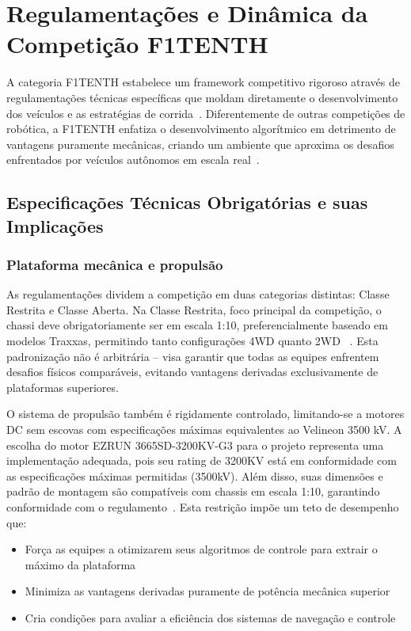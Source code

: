 \chapter{Regulamentações e Dinâmica da Competição F1TENTH}

A categoria F1TENTH estabelece um framework competitivo rigoroso através de
regulamentações técnicas específicas que moldam diretamente o desenvolvimento
dos veículos e as estratégias de corrida~\cite{F1TENTHRules2023}.
Diferentemente de outras competições de robótica, a F1TENTH enfatiza o
desenvolvimento algorítmico em detrimento de vantagens puramente mecânicas,
criando um ambiente que aproxima os desafios enfrentados por veículos autônomos
em escala real~\cite{OBrienF1TENTH2020}.

\section{Especificações Técnicas Obrigatórias e suas Implicações}

\subsection{Plataforma mecânica e propulsão}

As regulamentações dividem a competição em duas categorias distintas: Classe
Restrita e Classe Aberta. Na Classe Restrita, foco principal da competição, o
chassi deve obrigatoriamente ser em escala 1:10, preferencialmente baseado em
modelos Traxxas, permitindo tanto configurações 4WD quanto 2WD
~\cite{F1TENTHRules2023}. Esta padronização não é arbitrária -- visa garantir
que todas as equipes enfrentem desafios físicos comparáveis, evitando vantagens
derivadas exclusivamente de plataformas superiores.

O sistema de propulsão também é rigidamente controlado, limitando-se a motores
DC sem escovas com especificações máximas equivalentes ao Velineon 3500 kV. A
escolha do motor EZRUN 3665SD-3200KV-G3 para o projeto representa uma
implementação adequada, pois seu rating de 3200KV está em conformidade com as
especificações máximas permitidas (3500kV). Além disso, suas dimensões e padrão
de montagem são compatíveis com chassis em escala 1:10, garantindo conformidade
com o regulamento~\cite{F1TENTHRules2023}. Esta restrição impõe um teto de
desempenho que:

\begin{itemize}
      \item Força as equipes a otimizarem seus algoritmos de controle para extrair o máximo
            da plataforma
      \item Minimiza as vantagens derivadas puramente de potência mecânica superior
      \item Cria condições para avaliar a eficiência dos sistemas de navegação e controle
\end{itemize}


